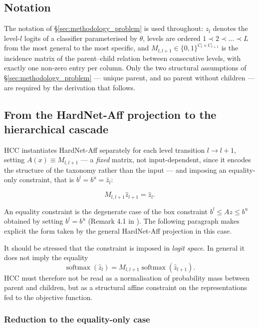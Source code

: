 \subsection{Notation}
\label{ssec:formulation}

The notation of \S\ref{sec:methodology_problem} is used throughout: $z_l$ denotes
the level-$l$ logits of a classifier parameterised by $\theta$, levels are ordered
$1\prec 2\prec\dots\prec L$ from the most general to the most specific, and
$M_{l,l+1}\in\{0,1\}^{C_l\times C_{l+1}}$ is the incidence matrix of the
parent--child relation between consecutive levels, with exactly one non-zero entry
per column. Only the two structural assumptions of
\S\ref{sec:methodology_problem} --- unique parent, and no parent without children
--- are required by the derivation that follows.

\subsection{From the HardNet-Aff projection to the hierarchical cascade}
\label{ssec:hardnet_to_hcc}

HCC instantiates HardNet-Aff separately for each level transition $l\to l+1$, setting $A(x)\equiv M_{l,l+1}$ --- a \emph{fixed} matrix, not input-dependent, since it encodes the structure of the taxonomy rather than the input --- and imposing an equality-only constraint, that is $b^l=b^u=\hat z_l$:

\[
M_{l,l+1}\hat z_{l+1}=\hat z_l.
\]

An equality constraint is the degenerate case of the box constraint $b^l\le A z\le b^u$ obtained by setting $b^l=b^u$ (Remark 4.1 in \cite{min2024hardnet}). The following paragraph makes explicit the form taken by the general HardNet-Aff projection in this case.

It should be stressed that the constraint is imposed in \emph{logit space}. In general it does not imply the equality
\[
\operatorname{softmax}(\hat z_l)
=
M_{l,l+1}\operatorname{softmax}(\hat z_{l+1}).
\]
HCC must therefore not be read as a normalisation of probability mass between parent and children, but as a structural affine constraint on the representations fed to the objective function.

\subsubsection{Reduction to the equality-only case}

